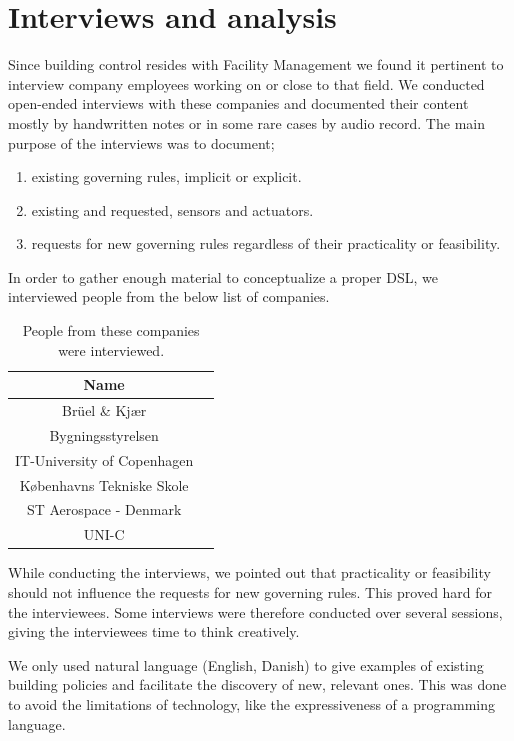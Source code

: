 \documentclass{llncs}
\begin{document}
\section{Interviews and analysis}\label{sec:interviews}
Since building control resides with Facility Management we found it pertinent to interview company employees working on or close to that field. We conducted open-ended interviews with these companies and documented their content mostly by handwritten notes or in some rare cases by audio record. The main purpose of the interviews was to document;

\begin{enumerate}
	\item existing governing rules, implicit or explicit.
	\item existing and requested, sensors and actuators.
	\item requests for new governing rules regardless of their practicality or feasibility.
\end{enumerate}

In order to gather enough material to conceptualize a proper DSL, we interviewed people from the below list of companies.\\ 

\begin{table}[htdp]
\begin{center}
\begin{tabular}{|c|c|}
	\textbf{Name}\\
	\hline 
	Br\"{u}el \& Kj\ae r\\
	Bygningsstyrelsen\\
	IT-University of Copenhagen\\
	K\o benhavns Tekniske Skole\\
	ST Aerospace - Denmark\\
	UNI-C\\
\end{tabular}
\end{center}
\label{tab:interviewees}
\caption{People from these companies were interviewed.}
\end{table}%

While conducting the interviews, we pointed out that practicality or feasibility should not influence the requests for new governing rules. This proved hard for the interviewees. Some interviews were therefore conducted over several sessions, giving the interviewees time to think creatively. 

We only used natural language (English, Danish) to give examples of existing building policies and facilitate the discovery of new, relevant ones. This was done to avoid the limitations of technology, like the expressiveness of a programming language.
\end{document}
